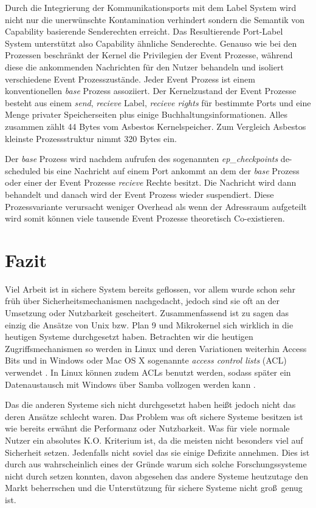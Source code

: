 \documentclass[11pt,technote]{IEEEtran}
\begin{document}
      Durch die Integrierung der Kommunikationsports mit dem Label System wird nicht nur die unerw\"unschte Kontamination verhindert sondern die Semantik von
      Capability basierende Senderechten erreicht. Das Resultierende Port-Label System unterst\"utzt also Capability \"ahnliche Senderechte.
      Genauso wie bei den Prozessen beschr\"ankt der Kernel die Privilegien der Event Prozesse, w\"ahrend diese die ankommenden Nachrichten f\"ur den Nutzer
      behandeln und isoliert verschiedene Event Prozesszust\"ande.
      Jeder Event Prozess ist einem konventionellen \textit{base} Prozess assoziiert. Der Kernelzustand der Event Prozesse besteht aus einem \textit{send}, 
      \textit{recieve} Label, \textit{recieve rights} f\"ur bestimmte Ports und eine Menge privater Speicherseiten plus einige Buchhaltungsinformationen.
      Alles zusammen z\"ahlt 44 Bytes vom Asbestos Kernelspeicher. Zum Vergleich Asbestos kleinste Prozessstruktur nimmt 320 Bytes ein. 
      
      Der \textit{base} Prozess wird nachdem aufrufen des sogenannten \textit{ep\_checkpoints} de-scheduled bis eine Nachricht auf einem Port ankommt 
      an dem der \textit{base} Prozess oder einer der Event Prozesse \textit{recieve} Rechte besitzt.
      Die Nachricht wird dann behandelt und danach wird der Event Prozess wieder suspendiert. Diese Prozessvariante verursacht weniger Overhead als wenn der
      Adressraum aufgeteilt wird somit k\"onnen viele tausende Event Prozesse theoretisch Co-existieren.
      
     
  \section{Fazit}
    Viel Arbeit ist in sichere System bereits geflossen, vor allem wurde schon sehr fr\"uh \"uber Sicherheitsmechanismen nachgedacht,
    jedoch sind sie oft an der Umsetzung oder Nutzbarkeit gescheitert. Zusammenfassend ist zu sagen das einzig die Ans\"atze von Unix bzw. Plan
    9 und Mikrokernel sich wirklich in die heutigen Systeme durchgesetzt haben. Betrachten wir die heutigen Zugriffsmechanismen so werden in Linux 
    und deren Variationen weiterhin Access Bits und in Windows oder Mac OS X sogenannte \textit{access control lists} (ACL) verwendet
    \cite{Url:windows:acl, Url:macosx:acl}. In Linux k\"onnen zudem ACLs benutzt werden, sodass sp\"ater ein Datenaustausch mit Windows \"uber
    Samba vollzogen werden kann \cite{Url:linux:acl}.    
    
    Das die anderen Systeme sich nicht durchgesetzt haben hei\ss t jedoch nicht das deren Ans\"atze schlecht waren.
    Das Problem was oft sichere Systeme besitzen ist wie bereits erw\"ahnt die Performanz oder Nutzbarkeit. Was f\"ur 
    viele normale Nutzer ein absolutes K.O. Kriterium ist, da die meisten nicht besonders viel auf Sicherheit setzen.
    Jedenfalls nicht soviel das sie einige Defizite annehmen. Dies ist durch aus wahrscheinlich eines der Gr\"unde warum sich solche
    Forschungssysteme nicht durch setzen konnten, davon abgesehen das andere Systeme heutzutage den Markt beherrschen und
    die Unterst\"utzung f\"ur sichere Systeme nicht gro\ss\ genug ist.   
    
    


\end{document}
